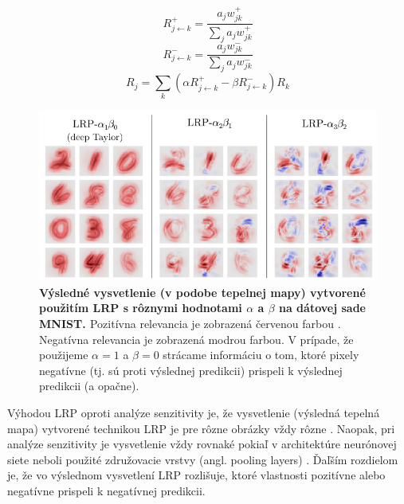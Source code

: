 
\begin{equation} 
    R_{j\leftarrow k}^{+} = \frac{a_j w_{j k}^+}{\sum_{j}^{} a_j w_{j k}^+}
    \label{eq:lrp_1}
\end{equation}
\begin{equation} 
    R_{j\leftarrow k}^{-} = \frac{a_j w_{j k}^-}{\sum_{j}^{} a_j w_{j k}^-}
    \label{eq:lrp_2}
\end{equation}
\begin{equation} 
    R_{j}=\sum_{k}^{} \left ( \alpha R_{j\leftarrow k}^{+} - \beta R_{j\leftarrow k}^{-} \right ) R_k
    \label{eq:lrp_3}
\end{equation}

\begin{figure}[h!]
\centering
\includegraphics[scale=0.5]{assets/images/lrp.png}
\caption{\textbf{Výsledné vysvetlenie (v podobe tepelnej mapy) vytvorené použitím LRP s rôznymi hodnotami $\alpha$ a $\beta$ na dátovej sade MNIST. \cite{montavon2018methods}} Pozitívna relevancia je zobrazená červenou farbou . \cite{montavon2018methods} Negatívna relevancia je zobrazená modrou farbou. \cite{montavon2018methods} V prípade, že použijeme $\alpha = 1$ a $\beta = 0$ strácame informáciu o tom, ktoré pixely negatívne (tj. sú proti výslednej predikcii) prispeli k výslednej predikcii (a opačne).}
\label{fig:lrp}
\end{figure}

Výhodou LRP oproti analýze senzitivity je, že vysvetlenie (výsledná tepelná mapa) vytvorené technikou LRP je pre rôzne obrázky vždy rôzne \cite{Muller_Samek_Montavon_Lapuschkin_Arras}. Naopak, pri analýze senzitivity je vysvetlenie vždy rovnaké pokiaľ v architektúre neurónovej siete neboli použité združovacie vrstvy (angl. pooling layers) \cite{Muller_Samek_Montavon_Lapuschkin_Arras}. Ďaľším rozdielom je, že vo výslednom vysvetlení LRP rozlišuje, ktoré vlastnosti pozitívne alebo negatívne prispeli k negatívnej predikcii.

